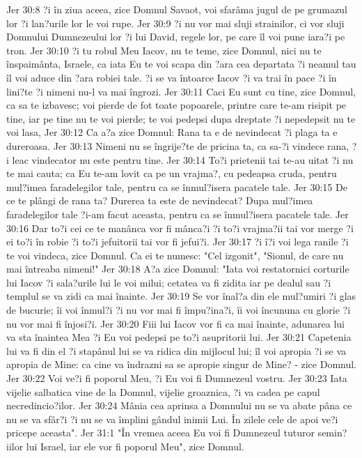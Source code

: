 Jer 30:8  ?i în ziua aceea, zice Domnul Savaot, voi sfarâma jugul de pe grumazul lor ?i lan?urile lor le voi rupe.
Jer 30:9  ?i nu vor mai sluji strainilor, ci vor sluji Domnului Dumnezeului lor ?i lui David, regele lor, pe care îl voi pune iara?i pe tron.
Jer 30:10  ?i tu robul Meu Iacov, nu te teme, zice Domnul, nici nu te înspaimânta, Israele, ca iata Eu te voi scapa din ?ara cea departata ?i neamul tau îl voi aduce din ?ara robiei tale. ?i se va întoarce Iacov ?i va trai în pace ?i în lini?te ?i nimeni nu-l va mai îngrozi.
Jer 30:11  Caci Eu sunt cu tine, zice Domnul, ca sa te izbavesc; voi pierde de fot toate popoarele, printre care te-am risipit pe tine, iar pe tine nu te voi pierde; te voi pedepsi dupa dreptate ?i nepedepsit nu te voi lasa,
Jer 30:12  Ca a?a zice Domnul: Rana ta e de nevindecat ?i plaga ta e dureroasa.
Jer 30:13  Nimeni nu se îngrije?te de pricina ta, ca sa-?i vindece rana, ?i leac vindecator nu este pentru tine.
Jer 30:14  To?i prietenii tai te-au uitat ?i nu te mai cauta; ca Eu te-am lovit ca pe un vrajma?, cu pedeapsa cruda, pentru mul?imea faradelegilor tale, pentru ca se înmul?isera pacatele tale.
Jer 30:15  De ce te plângi de rana ta? Durerea ta este de nevindecat? Dupa mul?imea faradelegilor tale ?i-am facut aceasta, pentru ca se înmul?isera pacatele tale.
Jer 30:16  Dar to?i cei ce te manânca vor fi mânca?i ?i to?i vrajma?ii tai vor merge ?i ei to?i în robie ?i to?i jefuitorii tai vor fi jefui?i.
Jer 30:17  ?i î?i voi lega ranile ?i te voi vindeca, zice Domnul. Ca ei te numesc: "Cel izgonit", "Sionul, de care nu mai întreaba nimeni!"
Jer 30:18  A?a zice Domnul: "Iata voi restatornici corturile lui Iacov ?i sala?urile lui le voi milui; cetatea va fi zidita iar pe dealul sau ?i templul se va zidi ca mai înainte.
Jer 30:19  Se vor înal?a din ele mul?umiri ?i glas de bucurie; îi voi înmul?i ?i nu vor mai fi împu?ina?i, îi voi încununa cu glorie ?i nu vor mai fi înjosi?i.
Jer 30:20  Fiii lui Iacov vor fi ca mai înainte, adunarea lui va sta înaintea Mea ?i Eu voi pedepsi pe to?i asupritorii lui.
Jer 30:21  Capetenia lui va fi din el ?i stapânul lui se va ridica din mijlocul lui; îl voi apropia ?i se va apropia de Mine: ca cine va îndrazni sa se apropie singur de Mine? - zice Domnul.
Jer 30:22  Voi ve?i fi poporul Meu, ?i Eu voi fi Dumnezeul vostru.
Jer 30:23  Iata vijelie salbatica vine de la Domnul, vijelie groaznica, ?i va cadea pe capul necredincio?ilor.
Jer 30:24  Mânia cea aprinsa a Domnului nu se va abate pâna ce nu se va sfâr?i ?i nu se va împlini gândul inimii Lui. În zilele cele de apoi ve?i pricepe aceasta".
Jer 31:1  "În vremea aceea Eu voi fi Dumnezeul tuturor semin?iilor lui Israel, iar ele vor fi poporul Meu", zice Domnul.
